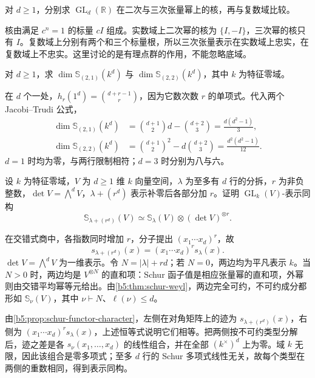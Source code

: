 \begin{exercise}\label{b5:ex:07-general-linear-kernel}
	对 \(d\ge1\)，分别求 \(\operatorname{GL}_d(\mathbb R)\) 在二次与三次张量幂上的核，再与复数域比较。
\end{exercise}
\begin{solution}
	核由满足 \(c^n=1\) 的标量 \(cI\) 组成。实数域上二次幂的核为 \(\{I,-I\}\)，三次幂的核只有 \(I\)。复数域上分别有两个和三个标量根，所以三次张量表示在实数域上忠实，在复数域上不忠实。这里讨论的是有理点群的作用，不能忽略底域。
\end{solution}

\begin{exercise}\label{b5:ex:07-schur-dimensions}
	对 \(d\ge1\)，求 \(\dim\mathbb S_{(2,1)}(k^d)\) 与 \(\dim\mathbb S_{(2,2)}(k^d)\)，其中 \(k\) 为特征零域。
\end{exercise}
\begin{solution}
	在 \(d\) 个一处，\(h_r(1^d)=\binom{d+r-1}{r}\)，因为它数次数 \(r\) 的单项式。代入两个 Jacobi--Trudi 公式，
	\begin{align*}
		\dim\mathbb S_{(2,1)}(k^d) &=\binom{d+1}{2}d-\binom{d+2}{3} =\frac{d(d^2-1)}3,\\
		\dim\mathbb S_{(2,2)}(k^d) &=\binom{d+1}{2}^2-d\binom{d+2}{3} =\frac{d^2(d^2-1)}{12}.
	\end{align*}
	\(d=1\) 时均为零，与两行限制相符；\(d=3\) 时分别为八与六。
\end{solution}

\begin{exercise}\label{b5:ex:07-determinant-shift}
	设 \(k\) 为特征零域，\(V\) 为 \(d\ge1\) 维 \(k\) 向量空间，\(\lambda\) 为至多有 \(d\) 行的分拆，\(r\) 为非负整数，\(\det V=\bigwedge^dV\)，\(\lambda+(r^d)\) 表示补零后各部分加 \(r\)。证明 \(\operatorname{GL}_k(V)\)-表示同构
	\[
		\mathbb S_{\lambda+(r^d)}(V) \simeq\mathbb S_\lambda(V)\otimes(\det V)^{\otimes r}.
	\]
\end{exercise}
\begin{solution}
	在交错式商中，各指数同时增加 \(r\)，分子提出 \((x_1\cdots x_d)^r\)，故
	\[
		s_{\lambda+(r^d)}(x)=(x_1\cdots x_d)^r s_\lambda(x).
	\]
	\(\det V=\bigwedge^dV\) 为一维表示。令 \(N=|\lambda|+rd\)；若 \(N=0\)，两边均为平凡表示 \(k\)。当 \(N>0\) 时，两边均是 \(V^{\otimes N}\) 的直和项：Schur 函子值是相应张量幂的直和项，外幂则由交错平均幂等元给出。由\cref{b5:thm:schur-weyl}，两边完全可约，不可约成分都形如 \(\mathbb S_\nu(V)\)，其中 \(\nu\vdash N\)、\(\ell(\nu)\le d\)。

	由\cref{b5:prop:schur-functor-character}，左侧在对角矩阵上的迹为 \(s_{\lambda+(r^d)}(x)\)，右侧为 \((x_1\cdots x_d)^r s_\lambda(x)\)，上述恒等式说明它们相等。把两侧按不可约类型分解后，迹之差是各 \(s_\nu(x_1,\ldots,x_d)\) 的线性组合，并在全部 \((k^\times)^d\) 上为零。域 \(k\) 无限，因此该组合是零多项式；至多 \(d\) 行的 Schur 多项式线性无关，故每个类型在两侧的重数相同，得到表示同构。
\end{solution}

